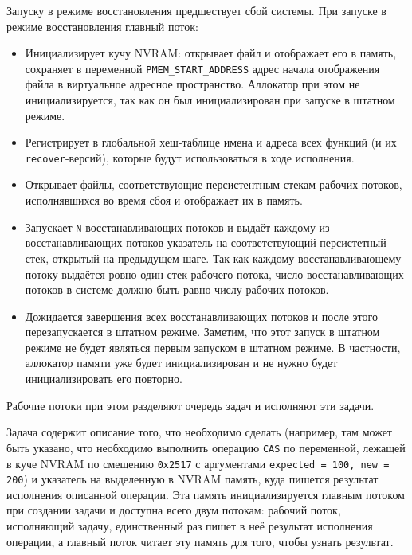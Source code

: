 \documentclass[times,specification,annotation]{itmo-student-thesis}
\begin{document}
\bigbreak

Запуску в режиме восстановления предшествует сбой системы. При запуске в режиме восстановления главный поток:

\begin{itemize}
    \item Инициализирует кучу NVRAM: открывает файл и отображает его в память, сохраняет в переменной \texttt{PMEM\_START\_ADDRESS} адрес начала отображения файла в виртуальное адресное пространство. Аллокатор при этом не инициализируется, так как он был инициализирован при запуске в штатном режиме.
    
    \item Регистрирует в глобальной хеш-таблице имена и адреса всех функций (и их \texttt{recover}-версий), которые будут использоваться в ходе исполнения.
    
    \item Открывает файлы, соответствующие персистентным стекам рабочих потоков, исполнявшихся во время сбоя и отображает их в память.
    
    \item Запускает \texttt{N} восстанавливающих потоков и выдаёт каждому из восстанавливающих потоков указатель на соответствующий персистетный стек, открытый на предыдущем шаге. Так как каждому восстанавливающему потоку выдаётся ровно один стек рабочего потока, число восстанавливающих потоков в системе должно быть равно числу рабочих потоков.
    
    \item Дожидается завершения всех восстанавливающих потоков и после этого перезапускается в штатном режиме. Заметим, что этот запуск в штатном режиме не будет являться первым запуском в штатном режиме. В частности, аллокатор памяти уже будет инициализирован и не нужно будет инициализировать его повторно.
\end{itemize}

\bigbreak

Рабочие потоки при этом разделяют очередь задач и исполняют эти задачи.

Задача содержит описание того, что необходимо сделать (например, там может быть указано, что необходимо выполнить операцию \texttt{CAS} по переменной, лежащей в куче NVRAM по смещению \texttt{0x2517} с аргументами \texttt{expected = 100, new = 200}) и указатель на выделенную в NVRAM память, куда пишется результат исполнения описанной операции. Эта память инициализируется главным потоком при создании задачи и доступна всего двум потокам: рабочий поток, исполняющий задачу, единственный раз пишет в неё результат исполнения операции, а главный поток читает эту память для того, чтобы узнать результат.
\end{document}

